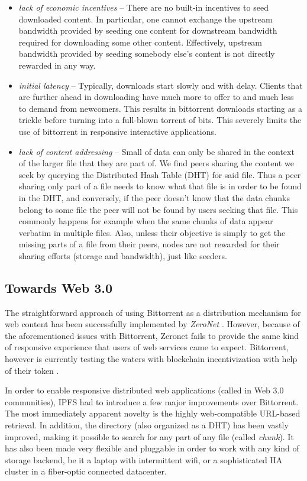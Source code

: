 \begin{itemize}
\item \emph{lack of economic incentives} -- 
There are no built-in incentives to seed downloaded content. In particular, one cannot exchange the upstream bandwidth provided by seeding one content for downstream bandwidth required for downloading some other content. Effectively, upstream bandwidth provided by seeding somebody else's content is not directly rewarded in any way.
\item \emph{initial latency} -- 
 Typically, downloads start slowly and with delay. Clients that are further ahead in downloading have much more to offer to and much less to demand from newcomers. This results in bittorrent downloads starting as a trickle before turning into a full-blown torrent of bits. This severely limits the use of bittorrent in responsive interactive applications.
\item \emph{lack of content addressing} -- Small  of data can only be shared in the context of the larger file that they are part of. We find peers sharing the content we seek by querying the Distributed Hash Table (DHT) for said file. Thus a peer sharing only part of a file needs to know what that file is in order to be found in the DHT, and conversely, if the peer doesn't know that the data chunks belong to some file the peer will not be found by users seeking that file. This commonly happens for example when the same chunks of data appear verbatim in multiple files. Also, unless their objective is simply to get the missing parts of a file from their peers, nodes are not rewarded for their sharing efforts (storage and bandwidth), just like seeders.

\end{itemize}

\subsection{Towards Web 3.0}

The straightforward approach of using Bittorrent as a distribution mechanism for web content has been successfully implemented by \emph{ZeroNet} \cite{zeronet}. However, because of the aforementioned issues with Bittorrent, Zeronet fails to provide the same kind of responsive experience that users of web services came to expect. Bittorrent, however is currently testing the waters with blockchain incentivization with help of their token \cite{tron}.

In order to enable responsive distributed web applications (called  in Web 3.0 communities), IPFS \cite{ipfs2014} had to introduce a few major improvements over Bittorrent. The most immediately apparent novelty is the highly web-compatible URL-based retrieval. In addition, the directory (also organized as a DHT) has been vastly improved, making it possible to search for any part of any file (called \emph{chunk}). It has also been made very flexible and pluggable in order to work with any kind of storage backend, be it a laptop with intermittent wifi, or a sophisticated HA cluster in a fiber-optic connected datacenter.


